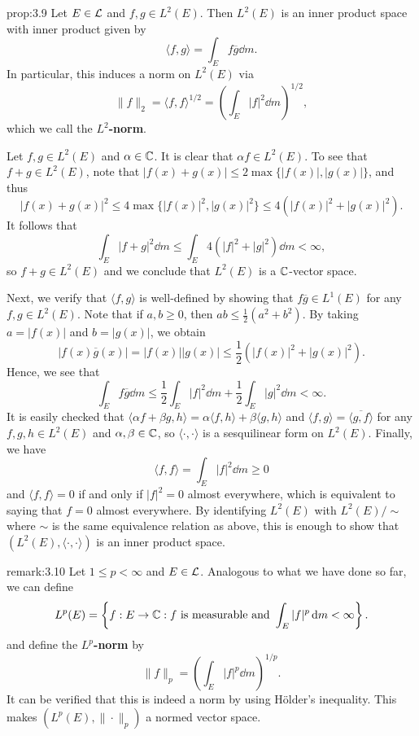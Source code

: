 \begin{prop}{prop:3.9}
    Let $E \in {\cal L}$ and $f, g \in L^2(E)$. Then $L^2(E)$ is an inner 
    product space with inner product given by 
    \[ \langle f, g \rangle = \int_E f\overline g\dd m. \] 
    In particular, this induces a norm on $L^2(E)$ via 
    \[ \|f\|_2 = \langle f, f \rangle^{1/2} = \left( \int_E |f|^2 \dd m 
    \right)^{\!1/2}, \] 
    which we call the {\bf $L^2$-norm}. 
\end{prop}
\begin{pf}
    Let $f, g \in L^2(E)$ and $\alpha \in \mathbb{C}$. It is clear that $\alpha f 
    \in L^2(E)$. To see that $f + g \in L^2(E)$, note that 
    $|f(x) + g(x)| \leq 2\max\{|f(x)|, |g(x)|\}$, and thus 
    \[ |f(x) + g(x)|^2 \leq 4\max\{|f(x)|^2, |g(x)|^2\} 
    \leq 4(|f(x)|^2 + |g(x)|^2). \] 
    It follows that 
    \[ \int_E |f + g|^2\dd m \leq \int_E 4(|f|^2 + |g|^2)\dd m < \infty, \] 
    so $f + g \in L^2(E)$ and we conclude that $L^2(E)$ is a $\mathbb{C}$-vector space. 

    Next, we verify that $\langle f, g \rangle$ is well-defined by 
    showing that $f\overline g \in L^1(E)$ for any $f, g \in L^2(E)$. 
    Note that if $a, b \geq 0$, then $ab \leq \frac12(a^2 + b^2)$. 
    By taking $a = |f(x)|$ and $b = |g(x)|$, we obtain 
    \[ |f(x) \overline g(x)| = |f(x)||g(x)| \leq \frac12(|f(x)|^2 + 
    |g(x)|^2). \] 
    Hence, we see that 
    \[ \int_E f\overline g\dd m \leq \frac12 \int_E |f|^2\dd m 
    + \frac12 \int_E |g|^2\dd m < \infty. \] 
    It is easily checked that $\langle \alpha f + \beta g, h \rangle 
    = \alpha \langle f, h \rangle + \beta \langle g, h \rangle$ 
    and $\langle f, g \rangle = \overline{\langle g, f \rangle}$ 
    for any $f, g, h \in L^2(E)$ and $\alpha, \beta \in \mathbb{C}$, so 
    $\langle \cdot, \cdot \rangle$ is a sesquilinear form on $L^2(E)$. 
    Finally, we have 
    \[ \langle f, f \rangle = \int_E |f|^2 \dd m \geq 0 \] 
    and $\langle f, f \rangle = 0$ if and only if $|f|^2 = 0$ almost 
    everywhere, which is equivalent to saying that $f = 0$ almost everywhere. 
    By identifying $L^2(E)$ with $L^2(E)/\!\sim$ where $\sim$ is the same 
    equivalence relation as above, this is enough to show that 
    $(L^2(E), \langle \cdot, \cdot \rangle)$ is an inner product space. 
\end{pf}

\begin{remark}{remark:3.10}
    Let $1 \leq p < \infty$ and $E \in {\cal L}$. Analogous to 
    what we have done so far, we can define 
    \[ L^p(E) = \left\{ f : E \to \mathbb{C} : f \text{ is measurable and }
    \int_E |f|^p \,\mathrm{d} m < \infty \right\}. \] 
    and define the {\bf $L^p$-norm} by 
    \[ \|f\|_p = \left( \int_E |f|^p \dd m \right)^{\!1/p}. \] 
    It can be verified that this is indeed a norm by using H\"older's inequality. 
    This makes $(L^p(E), \|\cdot\|_p)$ a normed vector space. 
\end{remark}

